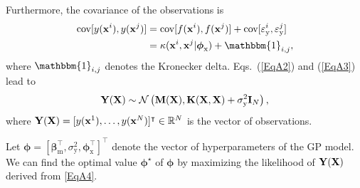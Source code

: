 \documentclass[iicol,sn-basic]{sn-jnl}%
\begin{document}
\begin{appendices}
Furthermore, the covariance of the observations is
\begin{equation}\label{EqA3}
	\begin{aligned}
		\text{cov}[y({\bf x}^i),y({\bf x}^j)] & = \text{cov}[f({\bf x}^i),f({\bf x}^j)] + \text{cov}[\varepsilon_\text{y}^i,\varepsilon_\text{y}^j]\\
		& = \kappa({\bf x}^i,{\bf x}^j|\boldsymbol \phi_{\text{x}}) + \mathbbm{1}_{i,j},
	\end{aligned}
\end{equation}
where $\mathbbm{1}_{i,j}$ denotes the Kronecker delta. Eqs.~(\ref{EqA2}) and (\ref{EqA3}) lead to
\begin{equation}\label{EqA4}
	{\bf Y}({\bf X}) \sim \mathcal{N} \left({\bf M}({\bf X}),{\bf K}({\bf X},{\bf X})+\sigma^2_\text{y} {\bf I}_N\right),
\end{equation}
where ${\bf Y}({\bf X})=[y({\bf x}^1),\dots,y({\bf x}^N)]^\intercal \in \mathbb{R}^N$ is the vector of observations.

Let ${\boldsymbol \phi} = [\boldsymbol \beta_{\text{m}}^\intercal,\sigma^2_\text{y},\boldsymbol \phi_{\text{x}}^\intercal]^\intercal$ denote the vector of hyperparameters of the GP model.
We can find the optimal value ${\boldsymbol \phi^\star}$ of ${\boldsymbol \phi}$ by maximizing the likelihood of ${\bf Y}({\bf X})$ derived from \cref{EqA4}.


\end{appendices}
\end{document}
